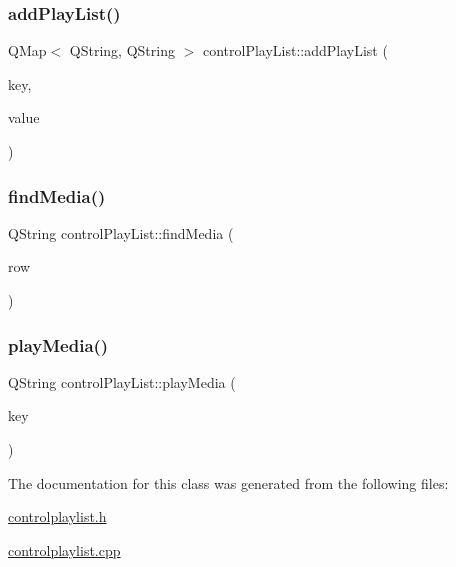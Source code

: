 \subsubsection{\texorpdfstring{addPlayList()}{addPlayList()}}
{\footnotesize\ttfamily Q\+Map$<$ Q\+String, Q\+String $>$ control\+Play\+List\+::add\+Play\+List (\begin{DoxyParamCaption}\item[{Q\+String}]{key,  }\item[{Q\+String}]{value }\end{DoxyParamCaption})}

\mbox{\label{classcontrol_play_list_acd7333092f3c4b6e92064b359061685c}} 
\subsubsection{\texorpdfstring{findMedia()}{findMedia()}}
{\footnotesize\ttfamily Q\+String control\+Play\+List\+::find\+Media (\begin{DoxyParamCaption}\item[{int}]{row }\end{DoxyParamCaption})}

\mbox{\label{classcontrol_play_list_a33cea74544c49e152cee319b93701304}} 
\subsubsection{\texorpdfstring{playMedia()}{playMedia()}}
{\footnotesize\ttfamily Q\+String control\+Play\+List\+::play\+Media (\begin{DoxyParamCaption}\item[{Q\+String}]{key }\end{DoxyParamCaption})}



The documentation for this class was generated from the following files\+:\begin{DoxyCompactItemize}
\item 
\mbox{\hyperlink{controlplaylist_8h}{controlplaylist.\+h}}\item 
\mbox{\hyperlink{controlplaylist_8cpp}{controlplaylist.\+cpp}}\end{DoxyCompactItemize}

